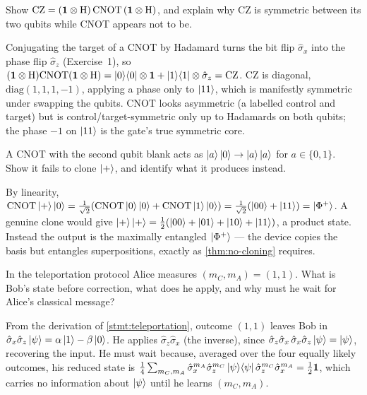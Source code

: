 \begin{exercise}
Show $\mathrm{CZ}=(\mathbf{1}\otimes\mathrm{H})\,\mathrm{CNOT}\,(\mathbf{1}\otimes\mathrm{H})$,
and explain why CZ is symmetric between its two qubits while CNOT
appears not to be.
\begin{solution}
Conjugating the target of a CNOT by Hadamard turns the bit flip
$\hat\sigma_x$ into the phase flip $\hat\sigma_z$ (Exercise~1), so
$(\mathbf{1}\otimes\mathrm{H})\mathrm{CNOT}(\mathbf{1}\otimes\mathrm{H})
=\ket{0}\!\bra{0}\otimes\mathbf{1}+\ket{1}\!\bra{1}\otimes\hat\sigma_z=\mathrm{CZ}$.
CZ is diagonal, $\mathrm{diag}(1,1,1,-1)$, applying a phase only to
$\ket{11}$, which is manifestly symmetric under swapping the qubits.
CNOT looks asymmetric (a labelled control and target) but is
control/target-symmetric only up to Hadamards on both qubits; the phase
$-1$ on $\ket{11}$ is the gate's true symmetric core.
\end{solution}
\end{exercise}

\begin{exercise}
A CNOT with the second qubit blank acts as $\ket{a}\ket{0}\to\ket{a}\ket{a}$
for $a\in\{0,1\}$. Show it fails to clone $\ket{+}$, and identify what it
produces instead.
\begin{solution}
By linearity,
$\mathrm{CNOT}\ket{+}\ket{0}
=\tfrac{1}{\sqrt2}(\mathrm{CNOT}\ket{0}\ket{0}+\mathrm{CNOT}\ket{1}\ket{0})
=\tfrac{1}{\sqrt2}(\ket{00}+\ket{11})=\ket{\Phi^+}$. A genuine clone
would give $\ket{+}\ket{+}=\tfrac12(\ket{00}+\ket{01}+\ket{10}+\ket{11})$,
a product state. Instead the output is the maximally entangled
$\ket{\Phi^+}$ --- the device copies the basis but entangles
superpositions, exactly as \cref{thm:no-cloning} requires.
\end{solution}
\end{exercise}

\begin{exercise}
In the teleportation protocol Alice measures $(m_C,m_A)=(1,1)$. What is
Bob's state before correction, what does he apply, and why must he wait
for Alice's classical message?
\begin{solution}
From the derivation of \cref{stmt:teleportation}, outcome $(1,1)$ leaves
Bob in $\hat\sigma_x\hat\sigma_z\ket{\psi}=\alpha\ket{1}-\beta\ket{0}$.
He applies $\hat\sigma_z\hat\sigma_x$ (the inverse), since
$\hat\sigma_z\hat\sigma_x\,\hat\sigma_x\hat\sigma_z\ket{\psi}=\ket{\psi}$,
recovering the input. He must wait because, averaged over the four
equally likely outcomes, his reduced state is
$\tfrac14\sum_{m_C,m_A}\hat\sigma_x^{m_A}\hat\sigma_z^{m_C}\ket{\psi}\!\bra{\psi}\hat\sigma_z^{m_C}\hat\sigma_x^{m_A}=\tfrac12\mathbf{1}$,
which carries no information about $\ket{\psi}$ until he learns
$(m_C,m_A)$.
\end{solution}
\end{exercise}

